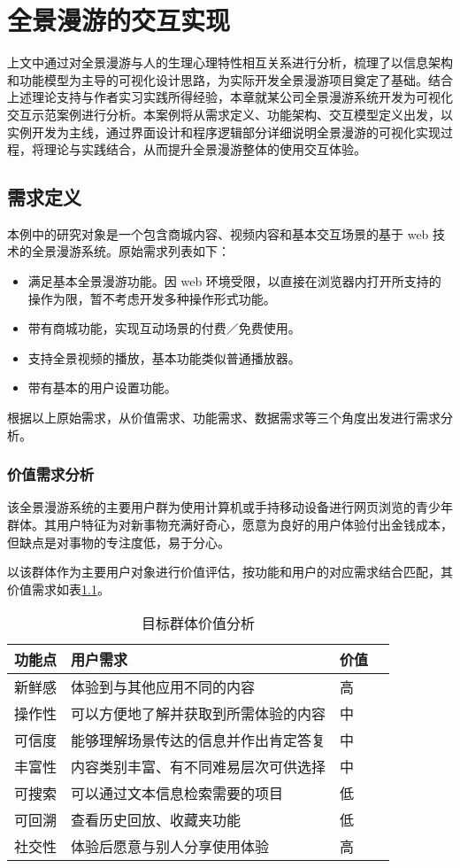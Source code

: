 \chapter{全景漫游的交互实现}
上文中通过对全景漫游与人的生理心理特性相互关系进行分析，梳理了以信息架构和功能模型为主导的可视化设计思路，为实际开发全景漫游项目奠定了基础。结合上述理论支持与作者实习实践所得经验，本章就某公司全景漫游系统开发为可视化交互示范案例进行分析。本案例将从需求定义、功能架构、交互模型定义出发，以实例开发为主线，通过界面设计和程序逻辑部分详细说明全景漫游的可视化实现过程，将理论与实践结合，从而提升全景漫游整体的使用交互体验。

\section{需求定义}
本例中的研究对象是一个包含商城内容、视频内容和基本交互场景的基于 web 技术的全景漫游系统。原始需求列表如下：
\begin{itemize}
	\item 满足基本全景漫游功能。因 web 环境受限，以直接在浏览器内打开所支持的操作为限，暂不考虑开发多种操作形式功能。
	\item 带有商城功能，实现互动场景的付费／免费使用。
	\item 支持全景视频的播放，基本功能类似普通播放器。
	\item 带有基本的用户设置功能。
\end{itemize}

根据以上原始需求，从价值需求、功能需求、数据需求等三个角度出发进行需求分析。

\subsection{价值需求分析}
该全景漫游系统的主要用户群为使用计算机或手持移动设备进行网页浏览的青少年群体。其用户特征为对新事物充满好奇心，愿意为良好的用户体验付出金钱成本，但缺点是对事物的专注度低，易于分心。

以该群体作为主要用户对象进行价值评估，按功能和用户的对应需求结合匹配，其价值需求如表\ref{tab:value}。

\begin{table}[htbp]
\centering
\caption{目标群体价值分析}
\vskip 5pt
\begin{tabular}{llll}
\toprule
功能点 & 用户需求 & 价值 \\
\midrule
新鲜感 & 体验到与其他应用不同的内容 & 高 \\
操作性 & 可以方便地了解并获取到所需体验的内容 & 中 \\
可信度 & 能够理解场景传达的信息并作出肯定答复 & 中 \\
丰富性 & 内容类别丰富、有不同难易层次可供选择 & 中 \\
可搜索 & 可以通过文本信息检索需要的项目 & 低 \\
可回溯 & 查看历史回放、收藏夹功能 & 低 \\
社交性 & 体验后愿意与别人分享使用体验 & 高 \\
\bottomrule
\end{tabular}
\label{tab:value}
\end{table}

